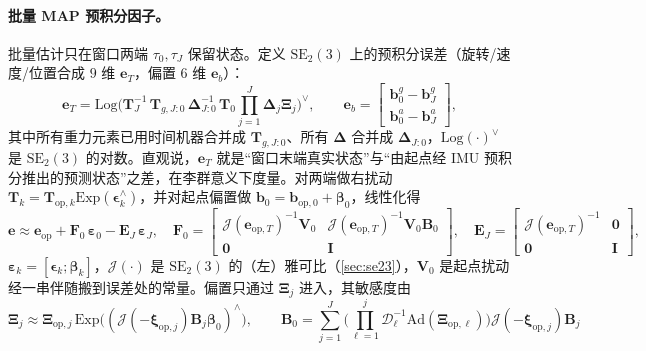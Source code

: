 \paragraph{批量 MAP 预积分因子。}
批量估计只在窗口两端 $\tau_0,\tau_J$ 保留状态。定义 $\mathrm{SE}_2(3)$ 上的预积分误差（旋转/速度/位置合成 $9$ 维 $\mathbf e_T$，偏置 $6$ 维 $\mathbf e_b$）\cite{barfoot2024state}：
\begin{equation}
  \mathbf e_T=\mathrm{Log}\!\Big(\mathbf T_J^{-1}\,\mathbf T_{g,J:0}\,\boldsymbol\Delta_{J:0}^{-1}\,\mathbf T_0\textstyle\prod_{j=1}^J\boldsymbol\Delta_j\boldsymbol\Xi_j\Big)^\vee,
  \qquad
  \mathbf e_b=\begin{bmatrix}\mathbf b^g_0-\mathbf b^g_J\\\mathbf b^a_0-\mathbf b^a_J\end{bmatrix},
  \label{eq:imu-se23-error}
\end{equation}
其中所有重力元素已用时间机器合并成 $\mathbf T_{g,J:0}$、所有 $\boldsymbol\Delta$ 合并成 $\boldsymbol\Delta_{J:0}$，$\mathrm{Log}(\cdot)^\vee$ 是 $\mathrm{SE}_2(3)$ 的对数。直观说，$\mathbf e_T$ 就是“窗口末端真实状态”与“由起点经 IMU 预积分推出的预测状态”之差，在李群意义下度量。对两端做右扰动 $\mathbf T_k=\mathbf T_{\mathrm{op},k}\mathrm{Exp}(\boldsymbol\epsilon_k^\wedge)$，并对起点偏置做 $\mathbf b_0=\mathbf b_{\mathrm{op},0}+\boldsymbol\beta_0$，线性化得
\begin{equation}
  \mathbf e\approx\mathbf e_{\mathrm{op}}+\mathbf F_0\,\boldsymbol\varepsilon_0-\mathbf E_J\,\boldsymbol\varepsilon_J,
  \quad
  \mathbf F_0=\begin{bmatrix}\boldsymbol{\mathcal J}(\mathbf e_{\mathrm{op},T})^{-1}\mathbf V_0&\boldsymbol{\mathcal J}(\mathbf e_{\mathrm{op},T})^{-1}\mathbf V_0\mathbf B_0\\\mathbf 0&\mathbf I\end{bmatrix},
  \quad
  \mathbf E_J=\begin{bmatrix}\boldsymbol{\mathcal J}(\mathbf e_{\mathrm{op},T})^{-1}&\mathbf 0\\\mathbf 0&\mathbf I\end{bmatrix},
  \label{eq:imu-se23-linerr}
\end{equation}
$\boldsymbol\varepsilon_k=[\boldsymbol\epsilon_k;\boldsymbol\beta_k]$，$\boldsymbol{\mathcal J}(\cdot)$ 是 $\mathrm{SE}_2(3)$ 的（左）雅可比（\cref{sec:se23}），$\mathbf V_0$ 是起点扰动经一串伴随搬到误差处的常量。偏置只通过 $\boldsymbol\Xi_j$ 进入，其敏感度由
\begin{equation}
  \boldsymbol\Xi_j\approx\boldsymbol\Xi_{\mathrm{op},j}\,\mathrm{Exp}\!\big((\boldsymbol{\mathcal J}(-\boldsymbol\xi_{\mathrm{op},j})\mathbf B_j\boldsymbol\beta_0)^\wedge\big),
  \qquad
  \mathbf B_0=\sum_{j=1}^J\Big(\textstyle\prod_{\ell=1}^j\mathcal D_\ell^{-1}\mathrm{Ad}(\boldsymbol\Xi_{\mathrm{op},\ell})\Big)\boldsymbol{\mathcal J}(-\boldsymbol\xi_{\mathrm{op},j})\mathbf B_j
  \label{eq:imu-se23-biasjac}
\end{equation}
